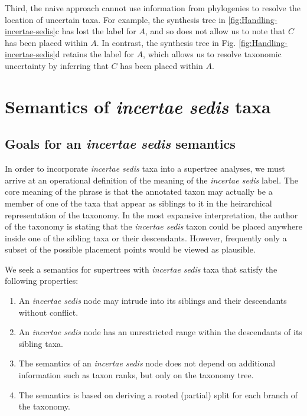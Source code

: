 \documentclass[english]{article}
\begin{document}
Third, the naive approach cannot use information from phylogenies to resolve the
location of uncertain taxa.  For example, the synthesis tree in
\ref{fig:Handling-incertae-sedis}c has lost the label for $A$, and so does not
allow us to note that $C$ has been placed within $A$.  In contrast, the synthesis
tree in Fig. \ref{fig:Handling-incertae-sedis}d retains the label for $A$, which
allows us to resolve taxonomic uncertainty by inferring that $C$ has been placed
within $A$.

\section{\label{sec:Semantics-of-incertae}Semantics of \emph{incertae
sedis} taxa}

\subsection{Goals for an \emph{incertae sedis} semantics}

In order to incorporate \emph{incertae sedis }taxa into a supertree
analyses, we must arrive at an operational definition of the meaning
of the \emph{incertae sedis} label.
The core meaning of the phrase is
that the annotated taxon may actually be a member of one of the taxa
that appear as siblings to it in the heirarchical representation of
the taxonomy.
In the most expansive interpretation, the author of the
taxonomy is stating that the \emph{incertae sedis} taxon could be
placed anywhere inside one of the sibling taxa or their descendants.
However, frequently only a subset of the possible placement points
would be viewed as plausible.

We seek a semantics for supertrees with \emph{incertae sedis }taxa
that satisfy the following properties:
\begin{enumerate}
    \item An \emph{incertae sedis} node may intrude into its siblings and their descendants without conflict.
    \item An \emph{incertae sedis} node has an unrestricted range within the descendants of its sibling taxa.
    \item The semantics of an \emph{incertae sedis} node does not depend on additional information such as taxon ranks, but only on the taxonomy tree.
    \item The semantics is based on deriving a rooted (partial) split for each branch of the taxonomy.
\end{enumerate}
\end{document}
